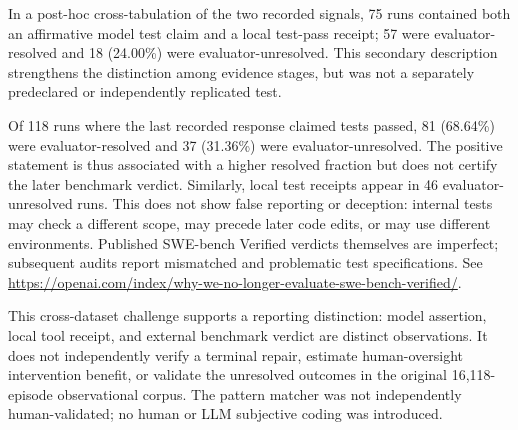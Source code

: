 In a post-hoc cross-tabulation of the two recorded signals, 75 runs
contained both an affirmative model test claim and a local test-pass receipt;
57 were evaluator-resolved and 18 (24.00\%) were evaluator-unresolved.
This secondary description strengthens the distinction among evidence
stages, but was not a separately predeclared or independently replicated
test.

Of 118 runs where the last recorded response claimed tests passed, 81
(68.64\%) were evaluator-resolved and 37 (31.36\%) were
evaluator-unresolved. The positive statement is thus associated with a
higher resolved fraction but does not certify the later benchmark verdict.
Similarly, local test receipts appear in 46 evaluator-unresolved runs.
This does not show false reporting or deception: internal tests may
check a different scope, may precede later code edits, or may use different
environments. Published SWE-bench Verified verdicts themselves are
imperfect; subsequent audits report mismatched and problematic test
specifications. See
\url{https://openai.com/index/why-we-no-longer-evaluate-swe-bench-verified/}.

This cross-dataset challenge supports a reporting distinction: model
assertion, local tool receipt, and external benchmark verdict are distinct
observations. It does not independently verify a terminal repair, estimate
human-oversight intervention benefit, or validate the unresolved outcomes
in the original 16,118-episode observational corpus. The pattern matcher
was not independently human-validated; no human or LLM subjective coding
was introduced.
